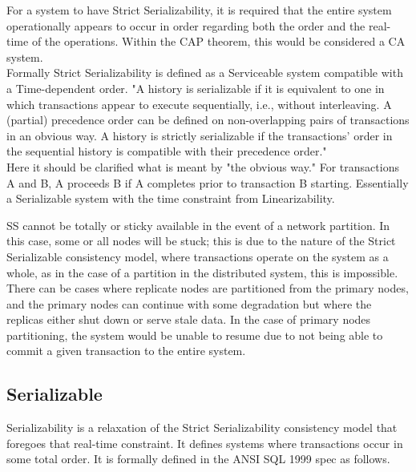 \documentclass[a4paper,10pt,titlepage]{report}
\begin{document}
For a system to have Strict Serializability, it is required that the entire system operationally appears to occur in order regarding both the order and the real-time of the operations. Within the CAP theorem, this would be considered a CA system.\\
\vspace{5mm}
Formally Strict Serializability is defined as a Serviceable system compatible with a Time-dependent order.
"A history is serializable if it is equivalent to one in which transactions appear to execute sequentially, i.e., without interleaving. A (partial) precedence order can be defined on non-overlapping pairs of transactions in an obvious way. A history is strictly serializable if the transactions' order in the sequential history is compatible with their precedence order." \cite{Herlihy1990Linearizability}\\
\vspace{5mm}
Here it should be clarified what is meant by "the obvious way." For transactions A and B, A proceeds B if A completes prior to transaction B starting. Essentially a Serializable system with the time constraint from Linearizability.

SS cannot be totally or sticky available in the event of a network partition. In this case, some or all nodes will be stuck; this is due to the nature of the Strict Serializable consistency model, where transactions operate on the system as a whole, as in the case of a partition in the distributed system, this is impossible. There can be cases where replicate nodes are partitioned from the primary nodes, and the primary nodes can continue with some degradation but where the replicas either shut down or serve stale data. In the case of primary nodes partitioning, the system would be unable to resume due to not being able to commit a given transaction to the entire system.


\vspace{2mm}

\vspace{2mm}


\subsection{Serializable}

Serializability is a relaxation of the Strict Serializability consistency model that foregoes that real-time constraint. It defines systems where transactions occur in some total order. It is formally defined in the ANSI SQL 1999 spec as follows.
\end{document}
